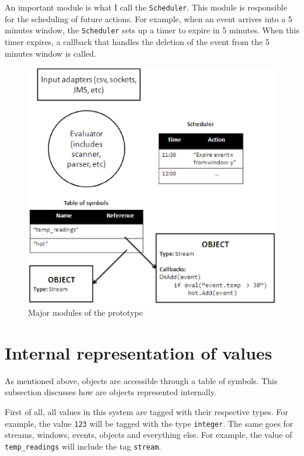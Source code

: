 \documentclass{report}
\begin{document}
An important module is what I call the \verb=Scheduler=. This module
is responsible for the scheduling of future actions. For example, when
an event arrives into a 5 minutes window, the \verb=Scheduler= sets up
a timer to expire in 5 minutes. When this timer expires, a callback
that handles the deletion of the event from the 5 minutes window is
called.

\begin{figure}[htbp]
  \centering
  \includegraphics[width=\textwidth]{stupid_diagram}
  \caption{Major modules of the prototype}
\end{figure}


\section{Internal representation of values}

As mentioned above, objects are accessible through a table of
symbols. This subsection discusses how are objects represented
internally.

First of all, all values in this system are tagged with their
respective types. For example, the value \verb=123= will be tagged
with the type \verb=integer=. The same goes for streams, windows,
events, objects and everything else. For example, the value of
\verb=temp_readings= will include the tag \verb=stream=.
\end{document}
